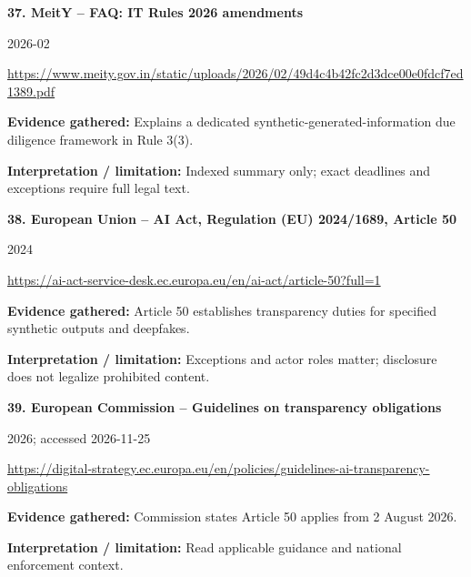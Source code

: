 \documentclass[11pt,a4paper]{article}
\begin{document}
\noindent\begin{minipage}{\linewidth}\textbf{37. MeitY -- FAQ: IT Rules 2026 amendments}\par{\small 2026-02\par\url{https://www.meity.gov.in/static/uploads/2026/02/49d4c4b42fc2d3dce00e0fdcf7ed1389.pdf}}\par
\textbf{Evidence gathered:} Explains a dedicated synthetic-generated-information due diligence framework in Rule 3(3).\par\textbf{Interpretation / limitation:} Indexed summary only; exact deadlines and exceptions require full legal text.\par
\end{minipage}\par\vspace{2mm}
\noindent\begin{minipage}{\linewidth}\textbf{38. European Union -- AI Act, Regulation (EU) 2024/1689, Article 50}\par{\small 2024\par\url{https://ai-act-service-desk.ec.europa.eu/en/ai-act/article-50?full=1}}\par
\textbf{Evidence gathered:} Article 50 establishes transparency duties for specified synthetic outputs and deepfakes.\par\textbf{Interpretation / limitation:} Exceptions and actor roles matter; disclosure does not legalize prohibited content.\par
\end{minipage}\par\vspace{2mm}
\noindent\begin{minipage}{\linewidth}\textbf{39. European Commission -- Guidelines on transparency obligations}\par{\small 2026; accessed 2026-11-25\par\url{https://digital-strategy.ec.europa.eu/en/policies/guidelines-ai-transparency-obligations}}\par
\textbf{Evidence gathered:} Commission states Article 50 applies from 2 August 2026.\par\textbf{Interpretation / limitation:} Read applicable guidance and national enforcement context.\par
\end{minipage}\par\vspace{2mm}
\end{document}
